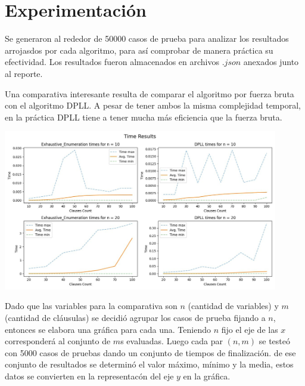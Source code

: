 \documentclass{article}
\begin{document}
\section*{Experimentación}
    Se generaron al rededor de 50000 casos de prueba para analizar los resultados arrojasdos por cada 
    algoritmo, para así comprobar de manera práctica su efectividad. Los resultados fueron almacenados en archivos 
    $.json$ anexados junto al reporte.
    
    Una comparativa interesante resulta de comparar el algoritmo por fuerza bruta con el algoritmo DPLL. A 
    pesar de tener ambos la misma complejidad temporal, en la práctica DPLL tiene a tener mucha más eficiencia 
    que la fuerza bruta. 

    \includegraphics*[width = 0.9\textwidth]{resources/comp_algs.png}
    
    Dado que las variables para la comparativa son $n$ (cantidad de variables) y $m$ (cantidad de cláusulas) se decidió
    agrupar los casos de prueba fijando a $n$, entonces se elabora una gráfica para cada una. Teniendo $n$ fijo el eje 
    de las $x$ corresponderá al conjunto de $m$s evaluadas. Luego cada par $(n,m)$ se testeó con 5000 casos de pruebas
    dando un conjunto de tiempos de finalización. de ese conjunto de resultados se determinó el valor máximo, mínimo 
    y la media, estos datos se convierten en la representacón del eje $y$ en la gráfica.




\end{document}
